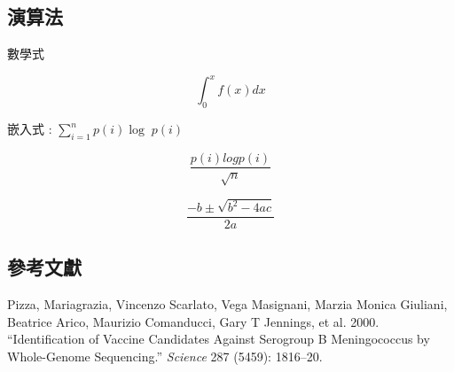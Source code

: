 \documentclass[
  a4paperpaper,
]{article}
\begin{document}
\hypertarget{ux6f14ux7b97ux6cd5}{%
\subsection{演算法}\label{ux6f14ux7b97ux6cd5}}

數學式

\[
\int_0^x f(x) dx
\]

嵌入式 : \(\sum_{i=1}^n p(i) \log \; p(i)\)

\[
\frac{p(i) log p(i)}{\sqrt{n}}
\]

\[
\frac{-b \pm \sqrt{b^2-4ac}}{2a}
\]

\hypertarget{ux53c3ux8003ux6587ux737b}{%
\subsection*{參考文獻}\label{ux53c3ux8003ux6587ux737b}}

\hypertarget{refs}{}
\leavevmode\hypertarget{ref-pizza2000identification}{}%
Pizza, Mariagrazia, Vincenzo Scarlato, Vega Masignani, Marzia Monica
Giuliani, Beatrice Arico, Maurizio Comanducci, Gary T Jennings, et al.
2000. ``Identification of Vaccine Candidates Against Serogroup B
Meningococcus by Whole-Genome Sequencing.'' \emph{Science} 287 (5459):
1816--20.
\end{document}
